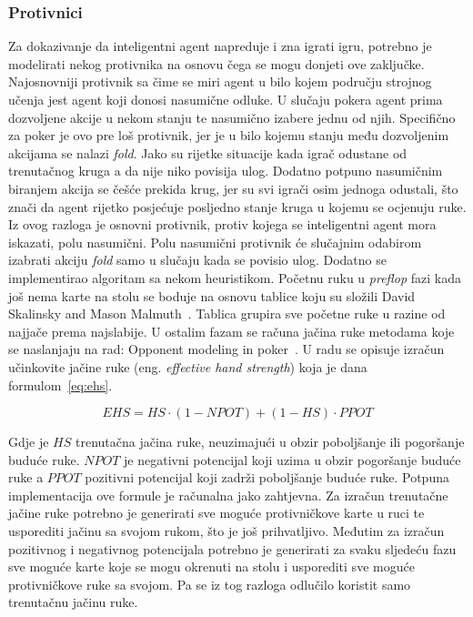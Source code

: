 \subsubsection{Protivnici}
Za dokazivanje da inteligentni agent napreduje i zna igrati igru, potrebno je modelirati nekog protivnika na osnovu čega se mogu donjeti ove zaključke. Najosnovniji protivnik sa čime se miri agent u bilo kojem području strojnog učenja jest agent koji donosi nasumične odluke. U slučaju pokera agent prima dozvoljene akcije u nekom stanju te nasumično izabere jednu od njih. Specifično za poker je ovo pre loš protivnik, jer je u bilo kojemu stanju među dozvoljenim akcijama se nalazi \textit{fold}. Jako su rijetke situacije kada igrač odustane od trenutačnog kruga a da nije niko povisija ulog. Dodatno potpuno nasumičnim biranjem akcija se češće prekida krug, jer su svi igrači osim jednoga odustali, što znači da agent rijetko posjećuje posljedno stanje kruga u kojemu se ocjenuju ruke. Iz ovog razloga je osnovni protivnik, protiv kojega se inteligentni agent mora iskazati, polu nasumični. Polu nasumični protivnik će slučajnim odabirom izabrati akciju \textit{fold} samo u slučaju kada se povisio ulog. Dodatno se implementirao algoritam sa nekom heuristikom. Početnu ruku u \textit{preflop} fazi kada još nema karte na stolu se boduje na osnovu tablice koju su složili David Skalinsky and Mason Malmuth~\cite{starting_hand_groups}. Tablica grupira sve početne ruke u razine od najjače prema najslabije. U ostalim fazam se računa jačina ruke metodama koje se naslanjaju na rad: Opponent modeling in poker~\cite{EHS}. U radu se opisuje izračun učinkovite jačine ruke (eng. \textit{effective hand strength}) koja je dana formulom~\ref{eq:ehs}.

\begin{equation}\label{eq:ehs}
EHS = HS \cdot (1 - NPOT) + (1 - HS) \cdot PPOT
\end{equation}

Gdje je $HS$ trenutačna jačina ruke, neuzimajući u obzir poboljšanje ili pogoršanje buduće ruke. $NPOT$ je negativni potencijal koji uzima u obzir pogoršanje buduće ruke a $PPOT$ pozitivni potencijal koji zadrži poboljšanje buduće ruke. Potpuna implementacija ove formule je računalna jako zahtjevna. Za izračun trenutačne jačine ruke potrebno je generirati sve moguće protivničkove karte u ruci te usporediti jačinu sa svojom rukom, što je još prihvatljivo. Međutim za izračun pozitivnog i negativnog potencijala potrebno je generirati za svaku sljedeću fazu sve moguće karte koje se mogu okrenuti na stolu i usporediti sve moguće protivničkove ruke sa svojom. Pa se iz tog razloga odlučilo koristit samo trenutačnu jačinu ruke.

